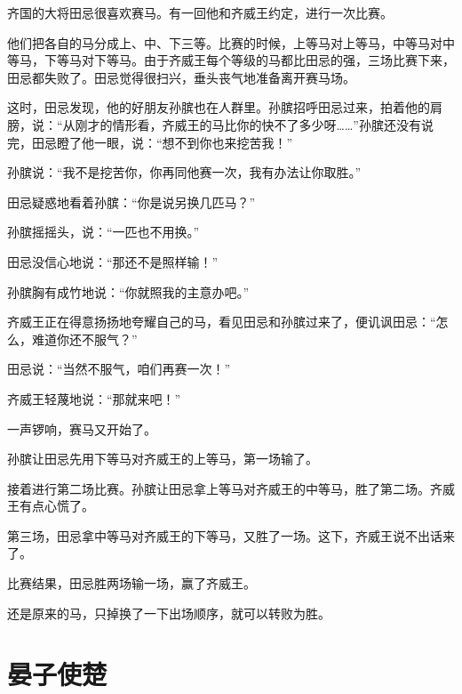 \documentclass[12pt,UTF-8,openany]{ctexbook}
\begin{document}
\begin{large}
    
    齐国的大将田忌很喜欢赛马。有一回他和齐威王约定，进行一次比赛。
    
    他们把各自的马分成上、中、下三等。比赛的时候，上等马对上等马，中等马对中等马，下等马对下等马。由于齐威王每个等级的马都比田忌的强，三场比赛下来，田忌都失败了。田忌觉得很扫兴，垂头丧气地准备离开赛马场。
    
    这时，田忌发现，他的好朋友孙膑也在人群里。孙膑招呼田忌过来，拍着他的肩膀，说：“从刚才的情形看，齐威王的马比你的快不了多少呀……”孙膑还没有说完，田忌瞪了他一眼，说：“想不到你也来挖苦我！”
    
    孙膑说：“我不是挖苦你，你再同他赛一次，我有办法让你取胜。”
    
    田忌疑惑地看着孙膑：“你是说另换几匹马？”
    
    孙膑摇摇头，说：“一匹也不用换。”
    
    田忌没信心地说：“那还不是照样输！”
    
    孙膑胸有成竹地说：“你就照我的主意办吧。”
    
    齐威王正在得意扬扬地夸耀自己的马，看见田忌和孙膑过来了，便讥讽田忌：“怎么，难道你还不服气？”
    
    田忌说：“当然不服气，咱们再赛一次！”
    
    齐威王轻蔑地说：“那就来吧！”
    
    一声锣响，赛马又开始了。
    
    孙膑让田忌先用下等马对齐威王的上等马，第一场输了。
    
    接着进行第二场比赛。孙膑让田忌拿上等马对齐威王的中等马，胜了第二场。齐威王有点心慌了。
    
    第三场，田忌拿中等马对齐威王的下等马，又胜了一场。这下，齐威王说不出话来了。
    
    比赛结果，田忌胜两场输一场，赢了齐威王。
    
    还是原来的马，只掉换了一下出场顺序，就可以转败为胜。
    
\end{large}



\chapter{晏子使楚}
\end{document}
